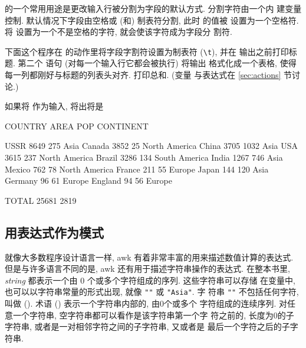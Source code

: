 \BEGIN 的一个常用用途是更改输入行被分割为字段的默认方式. 分割字符由一个内
建变量 \fs 控制. 默认情况下字段由空格或 (和) 制表符分割, 此时 \fs 的值被%
%
设置为一个空格符. 将 \fs 设置为一个不是空格的字符, 就会使该字符成为字段分
割符.

下面这个程序在 \BEGIN 的动作里将字段字割符设置为制表符 (\verb'\t'), 并在
输出之前打印标题. 第二个 \printf 语句 (对每一个输入行它都会被执行) 将输出
格式化成一个表格, 使得每一列都刚好与标题的列表头对齐. \END 打印总和. (变量
与表达式在 \ref{sec:actions} 节讨论.)
如果将  作为输入, 将出将是
\begin{file}
   COUNTRY   AREA   POP   CONTINENT

      USSR   8649   275   Asia
    Canada   3852    25   North America
     China   3705  1032   Asia
       USA   3615   237   North America
    Brazil   3286   134   South America
     India   1267   746   Asia
    Mexico    762    78   North America
    France    211    55   Europe
     Japan    144   120   Asia
   Germany     96    61   Europe
   England     94    56   Europe

     TOTAL  25681  2819
\end{file}

\subsection{用表达式作为模式}
\label{subsec:expressions_as_patterns}

就像大多数程序设计语言一样, awk 有着非常丰富的用来描述数值计算的表达式.
但是与许多语言不同的是, awk 还有用于描述字符串操作的表达式. 在整本书里,
\textit{string} 都表示一个由 0 个或多个字符组成的序列. 这些字符串可以存储
在变量中, 也可以以字符串常量的形式出现, 就像 \verb'""' 或 \verb'"Asia"'.
字%
符串 \verb'""' 不包括任何字符, 叫做  ().
术语  () 表示一个字符串内部的, 由0个或多个
字符组成的连续序列. 对任意一个字符串, 空字符串都可以看作是该字符串第一个字
符之前的, 长度为0的子字符串, 或者是一对相邻字符之间的子字符串, 又或者是
最后一个字符之后的子字符串.

